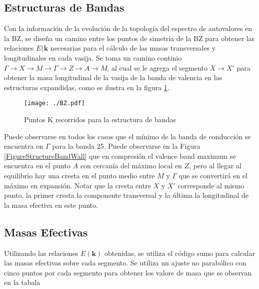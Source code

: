 \subsection{Estructuras de Bandas}

Con la información de la evolución de la topología del espectro de autovalores en 
la BZ, se diseña un camino entre los puntos de simetría de la BZ para obtener las 
relaciones  $E(\mathbf{k}$ necesarias para el cálculo de las masas transversales y
longitudinales en cada vasija. Se toma un camino continio $\Gamma \rightarrow X \rightarrow
M \rightarrow \Gamma \rightarrow Z \rightarrow A \rightarrow M$, al cual se le agrega el segmento 
$ X \rightarrow X' $ para obtener la masa longitudinal de la vasija de la banda de valencia 
en las estructuras expandidas, como se ilustra en la figura \ref{FiguraKPath}.

\begin{figure}
  \centering
  \texttt{[image: ./BZ.pdf]}
  \caption{\label{FiguraKPath} Puntos K recorridos para la estructura de bandas}
\end{figure}

Puede observarse en todos los casos que el mínimo de la banda de conducción
se encuentra en $\Gamma$ para la banda 25. 
Puede observarse en la Figura \ref{FigureStructureBandWall} que en compresión
el valence band maximum se encuentra en el punto $A$ con cercanía del máximo 
local en $Z$, pero al llegar al equilibrio hay una cresta en el punto medio entre 
$M$ y $\Gamma$  que se convertirá en el máximo en expansión. Notar que la cresta entre 
$X$ y $X'$ corresponde al mismo punto, la primer cresta la componente transversal y 
la última la longitudinal de la masa efectiva en este punto.

\subsection{Masas Efectivas}

Utilizando las relaciones $E(\mathbf{k})$ obtenidas, se utiliza el código 
sumo \cite{MGanose2018} para calcular las masas efectivas sobre 
cada segmento. Se utiliza un ajuste no parabólico con cinco puntos por cada 
segmento para obtener los valore de masa que se observan en la tabala


